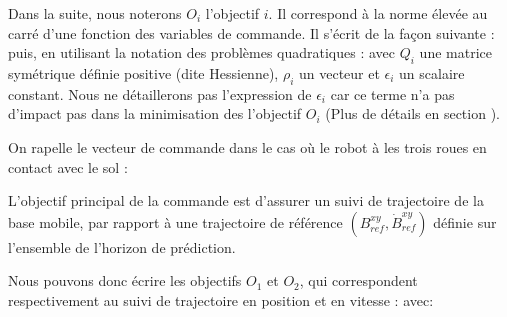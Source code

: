 				Dans la suite, nous noterons $O_i$ l'objectif $i$. Il correspond à la norme élevée au carré d'une fonction des variables de commande. Il s'écrit de la façon suivante :
				puis, en utilisant la notation des problèmes quadratiques :
				avec $Q_i$ une matrice symétrique définie positive (dite Hessienne), $\rho_i$ un vecteur et $\epsilon_i$ un scalaire constant.
				Nous ne détaillerons pas l'expression de $\epsilon_i$ car ce terme n'a pas d'impact pas dans la minimisation des l'objectif $O_i$ (Plus de détails en section ).
				
				On rapelle le vecteur de commande dans le cas où le robot à les trois roues en contact avec le sol :
				
					L'objectif principal de la commande est d'assurer un suivi de trajectoire de la base mobile, par rapport à une trajectoire de référence $(B^{xy}_{ref}, \dot{B}^{xy}_{ref})$ définie sur l'ensemble de l'horizon de prédiction.
					
					Nous pouvons donc écrire les objectifs $O_1$ et $O_2$, qui correspondent respectivement au suivi de trajectoire en position et en vitesse :
					avec:
				
